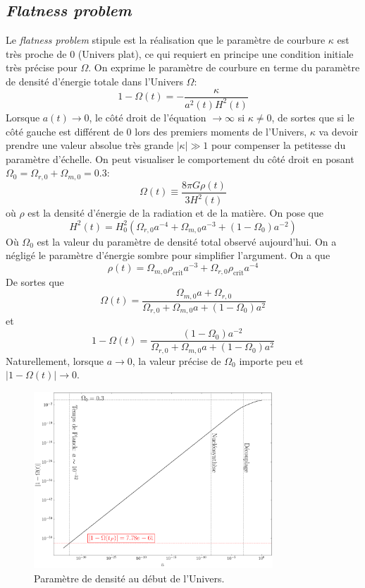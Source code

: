 \documentclass{article}
\numberwithin{equation}{section}
\begin{document}
\subsection{\textit{Flatness problem}}
Le \textit{flatness problem} stipule est la réalisation que le paramètre de courbure 
$\kappa$ est très proche de 0 (Univers plat), 
ce qui requiert en principe une condition initiale 
très précise pour $\Omega$. On exprime le paramètre de courbure en terme du paramètre de densité 
d'énergie totale dans l'Univers $\Omega$:
\[
        1 - \Omega(t) = -\frac{\kappa}{a^2(t) H^2(t)}
\]
Lorsque $a(t) \rightarrow 0$, le côté droit de l'équation $\rightarrow \infty $ si $\kappa \not= 0$, 
de sortes que si le côté gauche est différent de $0$ lors des premiers moments de l'Univers, 
$\kappa$ va devoir prendre une valeur absolue très grande $|\kappa| \gg 1$ pour compenser 
la petitesse du paramètre d'échelle. On peut visualiser le comportement du côté droit 
en posant $\Omega_{0} = \Omega_{r,0} + \Omega_{m,0} = 0.3$:
\[
        \Omega(t) \equiv \frac{8 \pi G \rho(t)}{3H^2(t)}
\]
où $\rho$ est la densité d'énergie de la radiation et de la matière. On pose que
\[
        H^2(t) = H_0^2 \left( \Omega_{r,0}a^{-4} + \Omega_{m,0}a^{-3}  + (1 - \Omega_0)a^{-2} \right)
\]
Où $\Omega_0$ est la valeur du paramètre de densité total observé aujourd'hui. On a négligé le 
paramètre d'énergie sombre pour simplifier l'argument.
On a que
\[
        \rho(t) = \Omega_{m, 0}\rho_{\mathrm{crit}}a^{-3} + \Omega_{r,0}\rho_{\mathrm{crit}}a^{-4}
\]
De sortes que
\[
        \Omega(t) = \frac{\Omega_{m, 0}a + \Omega_{r,0}}{\Omega_{r, 0} + \Omega_{m, 0}a + (1 - \Omega_0)a^{2}}
\]
et 
\[
        1 - \Omega(t) = \frac{(1 - \Omega_0)a^{-2}}{\Omega_{r, 0} + \Omega_{m,0}a + (1 - \Omega_0)a^{2}}
\]
Naturellement, lorsque $a \rightarrow 0$, la valeur précise de $\Omega_0$ importe 
peu et $|1 - \Omega(t)| \rightarrow 0$.
\begin{figure}[H]
        \centering
        \includegraphics[width=0.8\textwidth]{omega}
        \caption{Paramètre de densité au début de l'Univers.}
\end{figure}
\end{document}
